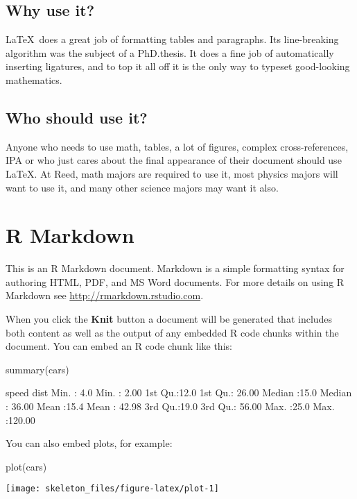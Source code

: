 \documentclass[12pt,twoside]{reedthesis}
\begin{document}
\section{Why use it?}

\LaTeX~does a great job of formatting tables and paragraphs. Its
line-breaking algorithm was the subject of a PhD.\thinspace thesis. It
does a fine job of automatically inserting ligatures, and to top it all
off it is the only way to typeset good-looking mathematics.

\section{Who should use it?}

Anyone who needs to use math, tables, a lot of figures, complex
cross-references, IPA or who just cares about the final appearance of
their document should use \LaTeX. At Reed, math majors are required to
use it, most physics majors will want to use it, and many other science
majors may want it also.

\chapter{R Markdown}

This is an R Markdown document. Markdown is a simple formatting syntax
for authoring HTML, PDF, and MS Word documents. For more details on
using R Markdown see \url{http://rmarkdown.rstudio.com}.

When you click the \textbf{Knit} button a document will be generated
that includes both content as well as the output of any embedded R code
chunks within the document. You can embed an R code chunk like this:

\begin{CodeChunk}
\begin{CodeInput}
summary(cars)
\end{CodeInput}
\begin{CodeOutput}
     speed           dist       
 Min.   : 4.0   Min.   :  2.00  
 1st Qu.:12.0   1st Qu.: 26.00  
 Median :15.0   Median : 36.00  
 Mean   :15.4   Mean   : 42.98  
 3rd Qu.:19.0   3rd Qu.: 56.00  
 Max.   :25.0   Max.   :120.00  
\end{CodeOutput}
\end{CodeChunk}

You can also embed plots, for example:

\begin{CodeChunk}
\begin{CodeInput}
plot(cars)
\end{CodeInput}


\begin{center}\texttt{[image: skeleton\_files/figure-latex/plot-1]} \end{center}

\end{CodeChunk}
\end{document}
